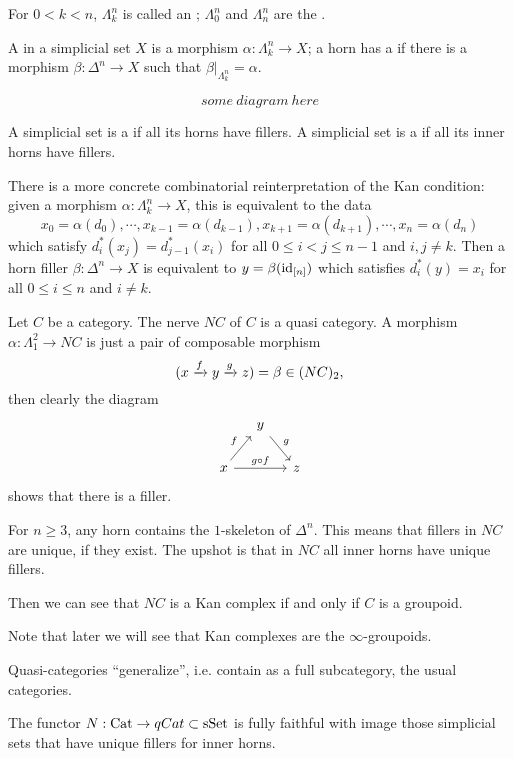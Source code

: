 For $0<k<n$, $\Lambda^n_k$ is called an ; $\Lambda^n_0$ and $\Lambda^n_n$ are the .

A  in a simplicial set $X$ is a morphism $\alpha:\Lambda^n_k\to X$; a horn has a  if there is a morphism $\beta:\Delta^n\to X$ such that $\beta|_{\Lambda^n_k}=\alpha$.

\[some\ diagram\ here\]

A simplicial set is a  if all its horns have fillers. A simplicial set is a  if all its inner horns have fillers.

There is a more concrete combinatorial reinterpretation of the Kan condition: given a morphism $\alpha:\Lambda^n_k\to X$, this is equivalent to the data
\[x_0=\alpha(d_0),\cdots,x_{k-1}=\alpha(d_{k-1}),x_{k+1}=\alpha(d_{k+1}),\cdots,x_n=\alpha(d_n)\]
which satisfy $d_i^*(x_j)=d_{j-1}^*(x_i)$ for all $0\le i<j\le n-1$ and $i,j\ne k$. Then a horn filler $\beta:\Delta^n\to X$ is equivalent to $y=\beta(\operatorname{id}_{[n]})$ which satisfies $d_i^*(y)=x_i$ for all $0\le i\le n$ and $i\ne k$.

\begin{example}
Let $C$ be a category. The nerve $NC$ of $C$ is a quasi category. A morphism $\alpha:\Lambda^2_1\to NC$ is just a pair of composable morphism
\[(x\xrightarrow{f}y\xrightarrow{g}z)=\beta\in (NC)_2,\]
then clearly the diagram
\[
\begin{tikzcd}[column sep=small]
& y \ar[dr,"g"] & \\
x \ar[ur,"f"] \ar[rr,"g\circ f"] & & z
\end{tikzcd}
\]
shows that there is a filler.

For $n\ge3$, any horn contains the $1$-skeleton of $\Delta^n$. This means that fillers in $NC$ are unique, if they exist. The upshot is that in $NC$ all inner horns have unique fillers.

Then we can see that $NC$ is a Kan complex if and only if $C$ is a groupoid.

Note that later we will see that Kan complexes are the $\infty$-groupoids.
\end{example}

Quasi-categories \enquote{generalize}, i.e. contain as a full subcategory, the usual categories.

\begin{proposition}
The functor $N:{\mathrm{Cat}}\to qCat\subset{\mathrm{sSet}}$ is fully faithful with image those simplicial sets that have unique fillers for inner horns.
\end{proposition}

